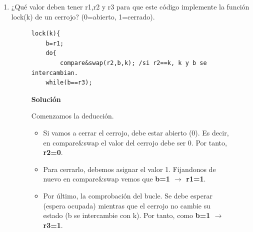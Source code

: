 \documentclass[12pt,spanish]{article}
\newenvironment{solution}{
	\par
	\textbf{Solución}
	\par
	\begin{center}
}
{
	\end{center}
}
\begin{document}
\begin{enumerate}
\begin{figure}[H]
\centering
\begin{subfigure}[b]{0.25\textwidth}
\begin{verbatim}
P1{
	X=2; // (a)
	Y=1; //(b)
}
\end{verbatim}
\end{subfigure}
\quad
\begin{subfigure}[b]{0.25\textwidth}
\begin{verbatim}
P2{
	R=1; //(c)
	if(Y==1) R=X; //(d)
}
\end{verbatim}
\end{subfigure}
\end{figure}
\begin{solution}
	Los posibles valores son 0,1 y 2. Veamos cuales se pueden obtener:
	\begin{itemize}
		\item 0: a$\rightarrow$d$\rightarrow$c$\rightarrow$b.
		\item 1: c$\rightarrow$a$\rightarrow$d$\rightarrow$b.
		\item 2: a$\rightarrow$b$\rightarrow$c$\rightarrow$d.
	\end{itemize}
	Por tanto, se cumplen todos.\\
	Si se respetara $W \rightarrow W$, los valores posibles serían 1 y 2.
\end{solution}
	\item ¿Qué valor deben tener r1,r2 y r3 para que este código implemente la función lock(k) de un cerrojo? (0=abierto, 1=cerrado).
	\begin{figure}[H]
\centering
\begin{verbatim}
lock(k){
	b=r1;
	do{
		compare&swap(r2,b,k); /si r2==k, k y b se intercambian.
	while(b==r3);
\end{verbatim}
\begin{solution}
Comenzamos la deducción.
	\begin{itemize}
		\item Si vamos a cerrar el cerrojo, debe estar abierto (0). Es decir, en compare\&swap el valor del cerrojo debe ser 0. Por tanto, \textbf{r2=0}.
		\item Para cerrarlo, debemos asignar el valor 1. Fijandonos de nuevo en compare\&swap vemos que \textbf{b=1 $\rightarrow$ r1=1}.
		\item Por último, la comprobación del bucle. Se debe esperar (espera ocupada) mientras que el cerrojo no cambie su estado (b se intercambie con k). Por tanto, como \textbf{b=1 $\rightarrow$ r3=1}.
	\end{itemize}
\end{solution}
\end{figure}
\end{enumerate}
\end{document}
